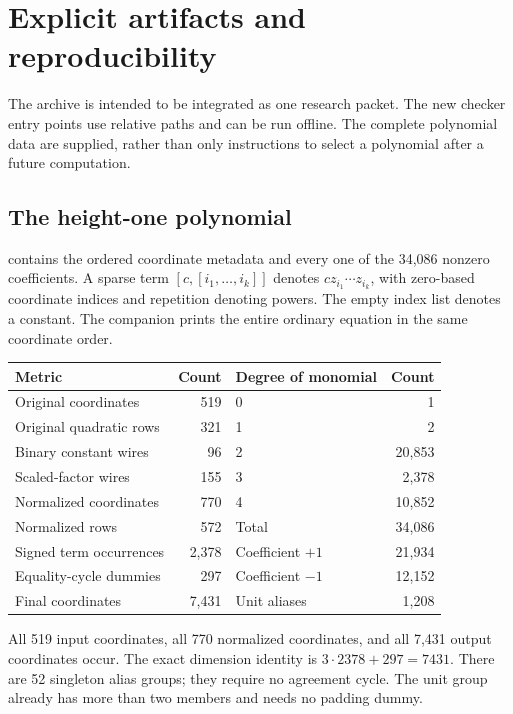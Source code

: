\section{Explicit artifacts and reproducibility}\label{sec:artifacts}

The archive is intended to be integrated as one research packet. The
new checker entry points use relative paths and can be run offline.
The complete polynomial data are supplied, rather than only instructions
to select a polynomial after a future computation.

\subsection{The height-one polynomial}

 contains the ordered coordinate
metadata and every one of the 34,086 nonzero coefficients. A sparse term
$[c,[i_1,\ldots,i_k]]$ denotes
$c z_{i_1}\cdots z_{i_k}$, with zero-based coordinate indices and
repetition denoting powers. The empty index list denotes a constant.
The companion  prints the entire ordinary equation
in the same coordinate order.

\begin{center}
\begin{tabular}{lr@{\qquad}lr}
\toprule
Metric & Count & Degree of monomial & Count\\
\midrule
Original coordinates & 519 & 0 & 1\\
Original quadratic rows & 321 & 1 & 2\\
Binary constant wires & 96 & 2 & 20,853\\
Scaled-factor wires & 155 & 3 & 2,378\\
Normalized coordinates & 770 & 4 & 10,852\\
Normalized rows & 572 & Total & 34,086\\
\midrule
Signed term occurrences & 2,378 & Coefficient $+1$ & 21,934\\
Equality-cycle dummies & 297 & Coefficient $-1$ & 12,152\\
Final coordinates & 7,431 & Unit aliases & 1,208\\
\bottomrule
\end{tabular}
\end{center}
All 519 input coordinates, all 770 normalized coordinates, and all 7,431
output coordinates occur. The exact dimension identity is
$3\cdot2378+297=7431$. There are 52 singleton alias groups; they
require no agreement cycle. The unit group already has more than two
members and needs no padding dummy.

